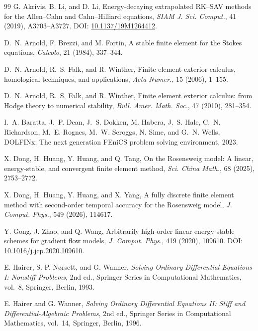\documentclass[11pt,a4paper]{article}
\newif\ifmarkchanges
\newcommand{\rev}[1]{{\ifmarkchanges\color{blue}\fi#1}}
\theoremstyle{definition}
\numberwithin{equation}{section}
\begin{document}
\begin{thebibliography}{99}
\small
\setlength{\itemsep}{3pt plus 1pt minus 1pt}
G. Akrivis, B. Li, and D. Li,
Energy-decaying extrapolated RK--SAV methods for the Allen--Cahn and
Cahn--Hilliard equations,
\emph{SIAM J. Sci. Comput.}, 41 (2019), A3703--A3727.
DOI: \href{https://doi.org/10.1137/19M1264412}{10.1137/19M1264412}.

D.~N. Arnold, F. Brezzi, and M. Fortin,
A stable finite element for the Stokes equations,
\emph{Calcolo}, \rev{21} (1984), 337--344.

D.~N. Arnold, R.~S. Falk, and R. Winther,
Finite element exterior calculus, homological techniques, and applications,
\emph{Acta Numer.}, 15 (2006), 1--155.

D.~N. Arnold, R.~S. Falk, and R. Winther,
Finite element exterior calculus: from Hodge theory to numerical stability,
\emph{Bull. Amer. Math. Soc.}, 47 (2010), 281--354.

I.~A. Baratta, J.~P. Dean, J.~S. Dokken, M. Habera, J.~S. Hale,
C.~N. Richardson, M.~E. Rognes, M.~W. Scroggs, N. Sime, and G.~N. Wells,
DOLFINx: The next generation FEniCS problem solving environment, 2023.

X. Dong, H. Huang, Y. Huang, and Q. Tang,
On the Rosensweig model: A linear, energy-stable, and convergent finite element method,
\emph{Sci. China Math.}, 68 (2025), 2753--2772.

X. Dong, H. Huang, Y. Huang, and X. Yang,
A fully discrete finite element method with second-order temporal accuracy for the Rosensweig model,
\emph{J. Comput. Phys.}, 549 (2026), 114617.

Y. Gong, J. Zhao, and Q. Wang,
Arbitrarily high-order linear energy stable schemes for gradient flow models,
\emph{J. Comput. Phys.}, 419 (2020), 109610.
DOI: \href{https://doi.org/10.1016/j.jcp.2020.109610}{10.1016/j.jcp.2020.109610}.

E. Hairer, S. P. N\o rsett, and G. Wanner,
\emph{Solving Ordinary Differential Equations I: Nonstiff Problems},
2nd ed., Springer Series in Computational Mathematics, vol.~8,
Springer, Berlin, 1993.

E. Hairer and G. Wanner,
\emph{Solving Ordinary Differential Equations II: Stiff and
Differential-Algebraic Problems}, 2nd ed.,
Springer Series in Computational Mathematics, vol.~14,
Springer, Berlin, 1996.


\end{thebibliography}
\end{document}
